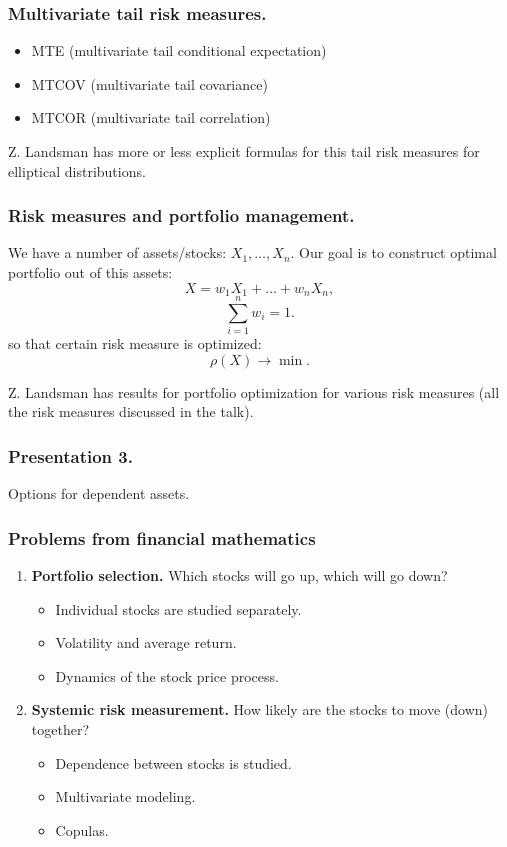 \documentclass{beamer}
\begin{document}
\begin{frame}[fragile]
\frametitle{Multivariate tail risk measures.}
\begin{itemize}
	\item MTE (multivariate tail conditional expectation)
	\item MTCOV (multivariate tail covariance)
	\item MTCOR (multivariate tail correlation)
\end{itemize}
Z. Landsman has more or less explicit formulas for this tail risk measures for elliptical distributions. 
\end{frame}
\begin{frame}[fragile]
\frametitle{Risk measures and portfolio management.}
We have a number of assets/stocks: $X_1, \ldots, X_n$. Our goal is to construct optimal portfolio out of this assets:
$$X = w_1X_1 + \ldots + w_nX_n,$$
$$\sum_{i=1}^n w_i = 1.$$
so that certain risk measure is optimized:
$$\rho(X) \longrightarrow \min.$$

Z. Landsman has results for portfolio optimization for various risk measures (all the risk measures discussed in the talk).
\end{frame}
\begin{frame}[fragile]
\frametitle{Presentation 3.}
\begin{center}
\Large{Options for dependent assets.}
\end{center}
\end{frame}
\begin{frame}[fragile]
\frametitle{Problems from financial mathematics}
\begin{enumerate}
	\item \textbf{Portfolio selection.} Which stocks will go up, which will go down?
	
	\begin{itemize}
		\item 	Individual stocks are studied separately.
    \item Volatility and average return.
		\item Dynamics of the stock price process.
	\end{itemize}
	\item \textbf{Systemic risk measurement.} How likely are the stocks to move (down) together?
	
\begin{itemize}
	\item 	Dependence between stocks is studied.
\item Multivariate modeling.
\item Copulas.
\end{itemize}
\end{enumerate}
\end{frame}
\end{document}
